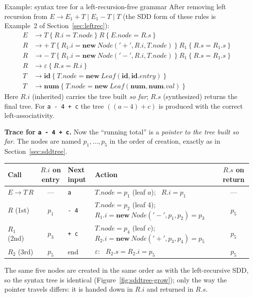 \documentclass[11pt,a4paper]{article}
\newcommand{\at}[2]{\ensuremath{#1.\mathit{#2}}}
\newcommand{\tok}[1]{\ensuremath{\mathtt{#1}}}
\begin{document}
\begin{examplebox}{Example: syntax tree for a left-recursion-free grammar}
After removing left recursion from $E \to E_1 + T \mid E_1 - T \mid T$ (the SDD form of these rules is Example~2 of Section~\ref{sec:leftrec}):
\begin{align*}
E &\to T\ \{\ \at{R}{i} = \at{T}{node}\ \}\ R\ \{\ \at{E}{node} = \at{R}{s}\ \}\\
R &\to +\ T\ \{\ \at{R_1}{i} = \mathbf{new}\ \mathit{Node}(\tok{'+'},\at{R}{i},\at{T}{node})\ \}\ R_1\ \{\ \at{R}{s} = \at{R_1}{s}\ \}\\
R &\to -\ T\ \{\ \at{R_1}{i} = \mathbf{new}\ \mathit{Node}(\tok{'-'},\at{R}{i},\at{T}{node})\ \}\ R_1\ \{\ \at{R}{s} = \at{R_1}{s}\ \}\\
R &\to \varepsilon\ \{\ \at{R}{s} = \at{R}{i}\ \}\\
T &\to \mathbf{id}\ \{\ \at{T}{node} = \mathbf{new}\ \mathit{Leaf}(\mathbf{id},\at{\mathbf{id}}{entry})\ \}\\
T &\to \mathbf{num}\ \{\ \at{T}{node} = \mathbf{new}\ \mathit{Leaf}(\mathbf{num},\at{\mathbf{num}}{val})\ \}
\end{align*}
Here $R.i$ (inherited) carries the tree built \emph{so far}; $R.s$ (synthesized) returns the final tree. For \texttt{a - 4 + c} the tree $((a - 4) + c)$ is produced with the correct left-associativity.

\textbf{Trace for \texttt{a - 4 + c}.} Now the ``running total'' is a \emph{pointer to the tree built so far}. The nodes are named $p_1,\dots,p_5$ in the order of creation, exactly as in Section~\ref{sec:sddtree}.
\begin{center}
\small
\begin{tabular}{@{}l c l L{5.6cm} c@{}}
\toprule
\textbf{Call} & $R.i$ \textbf{on entry} & \textbf{Next input} & \textbf{Action} & $R.s$ \textbf{on return} \\ \midrule
$E\to T\,R$ & --- & \texttt{a} & $T.node = p_1$ (leaf $a$); \ $R.i = p_1$ & --- \\
$R$ (1st) & $p_1$ & \texttt{- 4} & $T.node = p_2$ (leaf 4); \ $R_1.i = \mathbf{new}\ \mathit{Node}(\tok{'-'},p_1,p_2) = p_3$ & $p_5$ \\
$R_1$ (2nd) & $p_3$ & \texttt{+ c} & $T.node = p_4$ (leaf $c$); \ $R_2.i = \mathbf{new}\ \mathit{Node}(\tok{'+'},p_3,p_4) = p_5$ & $p_5$ \\
$R_2$ (3rd) & $p_5$ & end & $\varepsilon$: \ $R_2.s = R_2.i = p_5$ & $p_5$ \\ \bottomrule
\end{tabular}
\end{center}
The same five nodes are created in the same order as with the left-recursive SDD, so the syntax tree is identical (Figure~\ref{fig:sddtree-grow}); only the way the pointer travels differs: it is handed down in $R.i$ and returned in $R.s$.
\end{examplebox}
\end{document}
